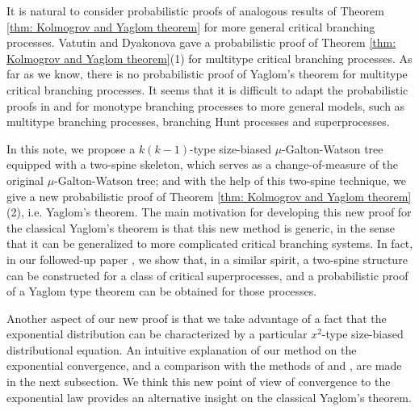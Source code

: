 \documentclass[12pt,a4paper]{amsart}
\numberwithin{equation}{section}
\begin{document}
	It is natural to consider probabilistic proofs of analogous results of Theorem \ref{thm: Kolmogrov and Yaglom theorem} for more general critical branching processes.
	Vatutin and  Dyakonova \cite{VD} gave a probabilistic proof of Theorem \ref{thm: Kolmogrov and Yaglom theorem}(1) for multitype critical branching processes.
	As far as we know, there is no probabilistic proof of Yaglom's theorem for multitype critical branching processes.
	It seems that it is difficult to adapt the probabilistic proofs in \cite{geiger2000new} and \cite{lyons1995conceptual} for monotype branching processes to more general models, such as multitype branching processes, branching Hunt processes and superprocesses.

	In this note, we propose a $k(k-1)$-type size-biased $\mu$-Galton-Watson tree equipped with a two-spine skeleton, which serves as a change-of-measure of the original $\mu$-Galton-Watson tree;
	and with the help of this two-spine technique, we give a new probabilistic proof of Theorem \ref{thm: Kolmogrov and Yaglom theorem}(2), i.e. Yaglom's theorem.
	The main motivation for developing this new proof for the classical Yaglom's theorem is that this new method is generic, in the sense that it can be generalized to more complicated critical branching systems.
	In fact, in our followed-up paper \cite{RenSongSun2017Spine}, we show that, in a similar spirit, a two-spine structure can be constructed for a class of critical superprocesses, and a probabilistic proof of a Yaglom type theorem can be obtained for those processes.



	Another aspect of our new proof is that we take advantage of a fact that the exponential distribution can be characterized by a particular $x^2$-type size-biased distributional equation.
	An intuitive explanation of our method on the exponential convergence, and a comparison with the methods of \cite{geiger2000new} and \cite{lyons1995conceptual}, are
	made in the next subsection.
	We think this new point of view of convergence to the exponential law provides an alternative insight on the classical Yaglom's theorem.
\end{document}
